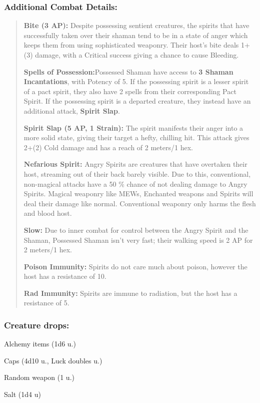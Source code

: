 \documentclass[11pt,a4paper,twocolumn]{book}
\begin{document}
	\subsubsection*{Additional Combat Details:}
	\begin{verse}
		\textbf{Bite (3 AP):} Despite possessing sentient creatures, the spirits that have successfully taken over their shaman tend to be in a state of anger which keeps them from using sophisticated weaponry. Their host's bite deals 1+(3) damage, with a Critical success giving a chance to cause Bleeding.
		
		\textbf{Spells of Possession:}Possessed Shaman have access to \textbf{3 Shaman Incantations}, with Potency of 5. If the possessing spirit is a lesser spirit of a pact spirit, they also have 2 spells from their corresponding Pact Spirit. If the possessing spirit is a departed creature, they instead have an additional attack, \textbf{Spirit Slap}.
		
		\textbf{Spirit Slap (5 AP, 1 Strain):} The spirit manifests their anger into a more solid state, giving their target a hefty, chilling hit. This attack gives 2+(2) Cold damage and has a reach of 2 meters/1 hex.
		
		\textbf{Nefarious Spirit:} Angry Spirits are creatures that have overtaken their host, streaming out of their back barely visible. Due to this, conventional, non-magical attacks have a 50 \% chance of not dealing damage to Angry Spirits. Magical weaponry like MEWs, Enchanted weapons and Spirits will deal their damage like normal. Conventional weaponry only harms the flesh and blood host.
		
		\textbf{Slow:} Due to inner combat for control between the Angry Spirit and the Shaman, Possessed Shaman isn't very fast; their walking speed is 2 AP for 2 meters/1 hex.
		
		\textbf{Poison Immunity:} Spirits do not care much about poison, however the host has a resistance of 10.
		
		\textbf{Rad Immunity:} Spirits are immune to radiation, but the host has a resistance of 5.
		
	\end{verse}
	
	\subsubsection*{Creature drops:}
	\begin{compactitem}
		\item Alchemy items (1d6 u.)
		\item Caps (4d10 u., Luck doubles u.)
		\item Random weapon (1 u.)
		\item Salt (1d4 u)
	\end{compactitem}
\end{document}
